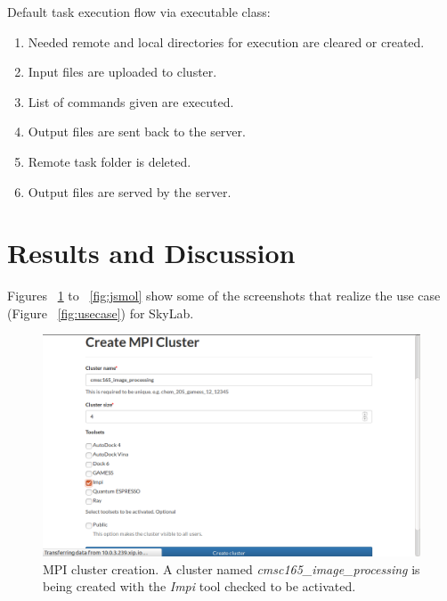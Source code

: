 Default task execution flow via executable class:			
	\begin{enumerate}
		\item  Needed remote and local directories for execution are cleared or created.
		\item  Input files are uploaded to cluster.
		\item  List of commands given are executed.
		\item  Output files are sent back to the server.
		\item  Remote task folder is deleted.
		\item  Output files are served by the server.
	\end{enumerate}	

	
\section{Results and Discussion}
Figures ~\ref{fig:mpicreate} to ~\ref{fig:jsmol} show some of the screenshots that realize the use case (Figure ~\ref{fig:usecase}) for SkyLab.

		
\begin{figure}			
	\includegraphics[scale=0.93]{./images/n_create_cluster_impi_printed.png}
	\caption{\label{fig:mpicreate}MPI cluster creation. A cluster named \textit{cmsc165\_image\_processing} is being created with the \textit{Impi} tool checked to be activated.}			
\end{figure}	
	
